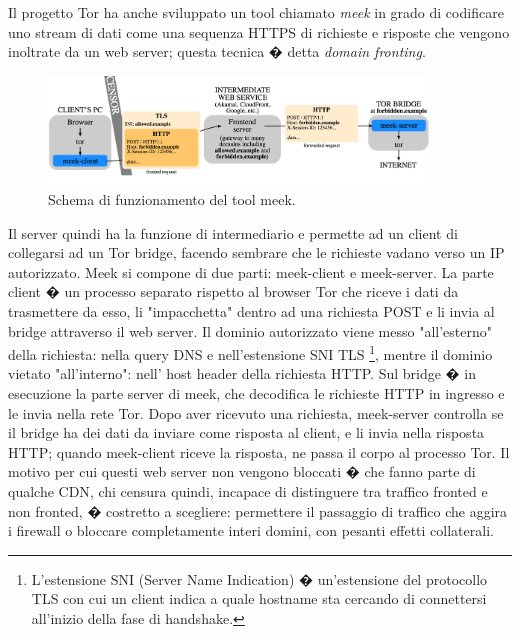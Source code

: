 Il progetto Tor ha anche sviluppato un tool chiamato \emph{meek} \cite{meek, domainfronting} in grado di codificare uno stream di dati come una sequenza HTTPS di richieste e risposte che vengono inoltrate da un web server; questa tecnica � detta \emph{domain fronting}.
\begin{figure}[!htbp]
\centering
\includegraphics[width=0.9\textwidth]{./figure//meek-diagram}
\caption{Schema di funzionamento del tool meek.}
\label{FIG:meek}
\end{figure}
Il server quindi ha la funzione di intermediario e permette ad un client di collegarsi ad un Tor bridge, facendo sembrare che le richieste vadano verso un IP autorizzato. Meek si compone di due parti: meek-client e meek-server. La parte client � un processo separato rispetto al browser Tor che riceve i dati da trasmettere da esso, li "impacchetta" dentro ad una richiesta POST e li invia al bridge attraverso il web server. Il dominio autorizzato viene messo "all'esterno" della richiesta: nella query DNS e nell'estensione SNI TLS \footnote{L'estensione SNI (Server Name Indication) � un'estensione del protocollo TLS con cui un client indica a quale hostname sta cercando di connettersi all'inizio della fase di handshake.}, mentre il dominio vietato "all'interno": nell' host header della richiesta HTTP. Sul bridge � in esecuzione la parte server di meek, che decodifica le richieste HTTP in ingresso e le invia nella rete Tor. Dopo aver ricevuto una richiesta, meek-server controlla se il bridge ha dei dati da inviare come risposta al client, e li invia nella risposta HTTP; quando meek-client riceve la risposta, ne passa il corpo al processo Tor. Il motivo per cui questi web server non vengono bloccati � che fanno parte di qualche CDN, chi censura quindi, incapace di distinguere tra traffico fronted e non fronted, � costretto a scegliere: permettere il passaggio di traffico che aggira i firewall o bloccare completamente interi domini, con pesanti effetti collaterali. 


